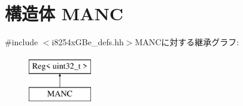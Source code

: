 \hypertarget{structiGbReg_1_1Regs_1_1MANC}{
\section{構造体 MANC}
\label{structiGbReg_1_1Regs_1_1MANC}
}


{\ttfamily \#include $<$i8254xGBe\_\-defs.hh$>$}MANCに対する継承グラフ:\begin{figure}[H]
\begin{center}
\leavevmode
\includegraphics[height=2cm]{structiGbReg_1_1Regs_1_1MANC}
\end{center}
\end{figure}
